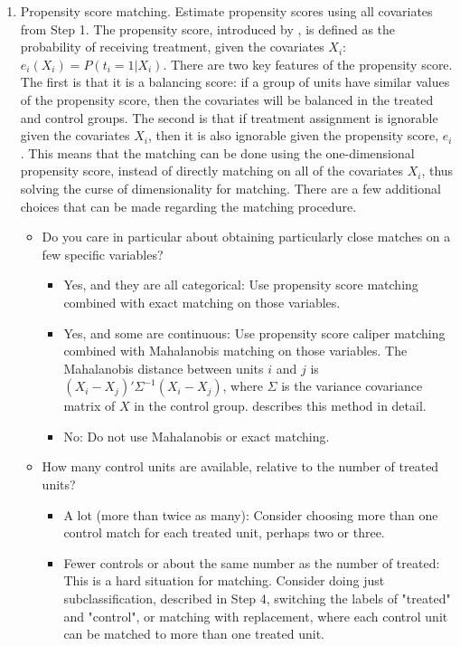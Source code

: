 \documentclass[11pt,titlepage]{article}
\begin{document}
\begin{enumerate}
\item  Propensity score matching.  Estimate propensity scores using all
covariates from Step 1.  The propensity score, introduced by \cite{RosRub83a}, is defined as the probability of receiving treatment, given
the covariates $X_i$: $e_i(X_i) = P(t_i=1 | X_i)$.  There are two key features of the propensity score.  The first is that it is a balancing score: if a group of units
have similar values of the propensity score, then the covariates will be balanced in the treated and control groups.  The second is that if treatment assignment
is ignorable given the covariates $X_i$, then it is also ignorable given the propensity score, $e_i$.  This means that the matching can be done using the one-dimensional
propensity score, instead of directly matching on all of the covariates $X_i$, thus solving the curse of dimensionality for matching.  
There are a few additional choices that can be made regarding the matching procedure.
\begin{itemize} \item Do you care in particular about obtaining particularly close matches on a few specific variables?
      	\begin{itemize} \item Yes, and they are all categorical: Use propensity
                  score matching combined with exact matching on those
                  variables.
                	\item Yes, and some are continuous: Use propensity score
                  caliper matching combined with Mahalanobis matching on those
                  variables.  The Mahalanobis distance between
		  units $i$ and $j$ is $(X_i-X_j)'\Sigma^{-1}(X_i-X_j)$, where $\Sigma$ is the variance covariance matrix of $X$ in the control group.  
		  \cite{RubTho00} describes this method in detail.
                     	\item No: Do not use Mahalanobis or exact matching.
      	\end{itemize}
                                                                                                                              
        	\item  How many control units are available, relative to the number of treated units?
        \begin{itemize} \item A lot (more than twice as many): Consider choosing more than one control match for each treated unit, perhaps two or three.
                        \item Fewer controls or about the same number as the number of treated:  This is a hard situation for matching.  Consider doing just
		   subclassification, described in Step 4, switching the labels of "treated" and "control", or matching with replacement, where each control unit can be 
		   matched to more than one treated unit.
        \end{itemize}
                                                                                                                                                     

\end{itemize}
\end{enumerate}
\end{document}
